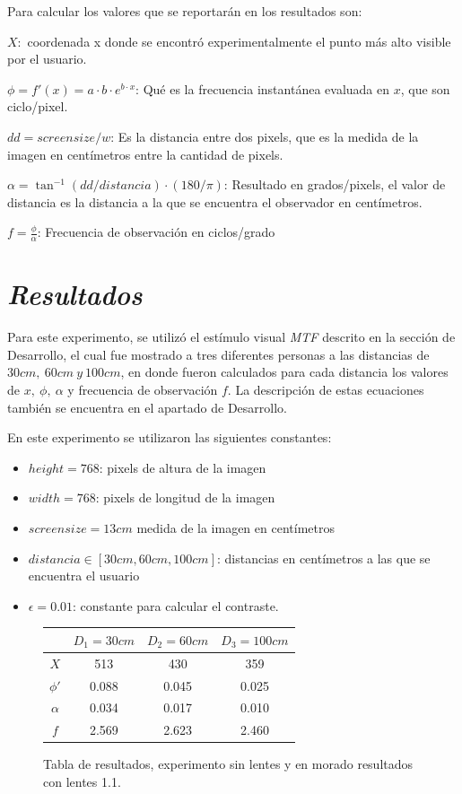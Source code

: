 \documentclass[conference]{IEEEtran}
\def\shadowLine{\vspace{3mm}}
\begin{document}
Para calcular los valores que se reportarán en los resultados son:

$X:$ coordenada x donde se encontró experimentalmente el punto más alto visible por el usuario.

$\phi=f'(x)= a\cdot b\cdot e^{b\cdot x}$: Qué es la frecuencia instantánea evaluada en $x$, que son ciclo/pixel.

$dd = screensize/w$: Es la distancia entre dos pixels, que es la medida de la imagen en centímetros entre la cantidad de pixels.

$\alpha= \tan^{-1}(dd/distancia)\cdot (180/\pi)$: Resultado en grados/pixels, el valor de distancia es la distancia a la que se encuentra el observador en centímetros.

\shadowLine
$f=\displaystyle\frac{\phi}{\alpha}$: Frecuencia de observación en ciclos/grado


\section{\textit{Resultados}}

Para este experimento, se utilizó el estímulo visual \textit{MTF} descrito en la sección de Desarrollo, el cual fue mostrado a tres diferentes personas a las distancias de $30cm,\ 60cm\ y\ 100cm$, en donde fueron calculados para cada distancia los valores de $x,\ \phi,\ \alpha$ y frecuencia de observación $f$. La descripción de estas ecuaciones también se encuentra en el apartado de Desarrollo.

En este experimento se utilizaron las siguientes constantes:
\begin{itemize}
\item $height = 768$: pixels de altura de la imagen
\item $width = 768$: pixels de longitud de la imagen
\item $screensize=13cm$ medida de la imagen en centímetros
\item $distancia\in [30cm,60cm,100cm]$: distancias en centímetros a las que se encuentra el usuario
\item $\epsilon=0.01$: constante para calcular el contraste.
\end{itemize}

\begin{figure}[htbp]
\centering

\begin{tabular}{c|c|c|c|}
	 & $D_1=30cm$ & $D_2=60cm$ & $D_3=100 cm$\\
	\hline
	$X$ & 513 & 430 & 359\\
	\hline
	$\phi'$ & 0.088 & 0.045 & 0.025\\
	\hline
	$\alpha$ & 0.034 & 0.017 & 0.010\\
	\hline
	$f$ & 2.569 & 2.623 & 2.460\\
	\hline
\end{tabular}

\caption{Tabla de resultados, experimento sin lentes y en morado resultados con lentes 1.1.}
\label{res1.1}
\end{figure}
\end{document}
